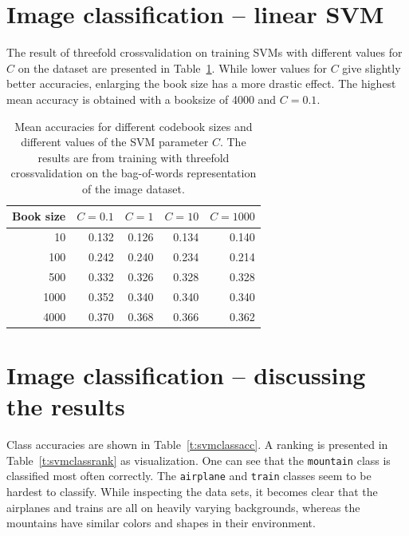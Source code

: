\documentclass[a4paper,10pt]{article}
\begin{document}
\section{Image classification -- linear SVM}
The result of threefold crossvalidation on training SVMs with different values for $C$ on the dataset are presented in Table~\ref{t:crosssvm}.  While lower values for $C$ give slightly better accuracies, enlarging the book size has a more drastic effect.  The highest mean accuracy is obtained with a booksize of 4000 and $C = 0.1$.
\begin{table}
  \centering
  \begin{tabular}{r|rrrr}
    Book size & $C = 0.1$ & $C = 1$ & $C = 10$ & $C = 1000$ \\
    \hline
      10 &  0.132 &  0.126 &  0.134 &  0.140 \\
     100 &  0.242 &  0.240 &  0.234 &  0.214 \\
     500 &  0.332 &  0.326 &  0.328 &  0.328 \\
    1000 &  0.352 &  0.340 &  0.340 &  0.340 \\
    4000 &  0.370 &  0.368 &  0.366 &  0.362 \\
  \end{tabular}
  \caption{Mean accuracies for different codebook sizes and different values of the SVM parameter $C$. The results are from training with threefold crossvalidation on the bag-of-words representation of the image dataset.}
  \label{t:crosssvm}
\end{table}

\section{Image classification -- discussing the results}
Class accuracies are shown in Table~\ref{t:svmclassacc}.  A ranking is presented in Table~\ref{t:svmclassrank} as visualization.  One can see that the \texttt{mountain} class is classified most often correctly.  The \texttt{airplane} and \texttt{train} classes seem to be hardest to classify.  While inspecting the data sets, it becomes clear that the airplanes and trains are all on heavily varying backgrounds, whereas the mountains have similar colors and shapes in their environment.
\end{document}
